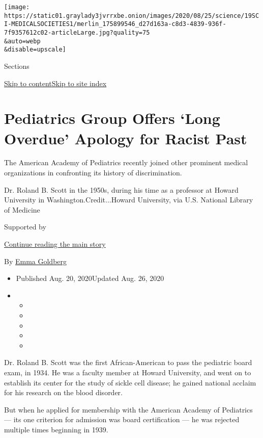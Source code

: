 \texttt{[image: https://static01.graylady3jvrrxbe.onion/images/2020/08/25/science/19SCI-MEDICALSOCIETIES1/merlin\_175899546\_d27d163a-c8d3-4839-936f-7f9357612c02-articleLarge.jpg?quality=75\\\&auto=webp\\\&disable=upscale]}

Sections

\protect\hyperlink{site-content}{Skip to
content}\protect\hyperlink{site-index}{Skip to site index}

\hypertarget{pediatrics-group-offers-long-overdue-apology-for-racist-past}{%
\section{Pediatrics Group Offers `Long Overdue' Apology for Racist
Past}\label{pediatrics-group-offers-long-overdue-apology-for-racist-past}}

The American Academy of Pediatrics recently joined other prominent
medical organizations in confronting its history of discrimination.

Dr. Roland B. Scott in the 1950s, during his time as a professor at
Howard University in Washington.Credit...Howard University, via U.S.
National Library of Medicine

Supported by

\protect\hyperlink{after-sponsor}{Continue reading the main story}

By \href{https://www.nytimes3xbfgragh.onion/by/emma-goldberg}{Emma
Goldberg}

\begin{itemize}
\item
  Published Aug. 20, 2020Updated Aug. 26, 2020
\item
  \begin{itemize}
  \item
  \item
  \item
  \item
  \item
  \end{itemize}
\end{itemize}

Dr. Roland B. Scott was the first African-American to pass the pediatric
board exam, in 1934. He was a faculty member at Howard University, and
went on to establish its center for the study of sickle cell disease; he
gained national acclaim for his research on the blood disorder.

But when he applied for membership with the American Academy of
Pediatrics --- its one criterion for admission was board certification
--- he was rejected multiple times beginning in 1939.

